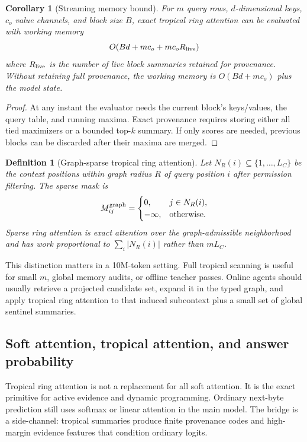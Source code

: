 \documentclass[11pt]{article}
\newtheorem{corollary}[theorem]{Corollary}
\newtheorem{definition}[theorem]{Definition}
\numberwithin{equation}{section}
\begin{document}
\begin{corollary}[Streaming memory bound]
For $m$ query rows, $d$-dimensional keys, $c_o$ value channels, and block size $B$, exact tropical ring attention can be evaluated with working memory
\begin{equation}
O(Bd+mc_o+m c_o R_{\rm live})
\end{equation}
where $R_{\rm live}$ is the number of live block summaries retained for provenance. Without retaining full provenance, the working memory is $O(Bd+mc_o)$ plus the model state.
\end{corollary}
\begin{proof}
At any instant the evaluator needs the current block's keys/values, the query table, and running maxima. Exact provenance requires storing either all tied maximizers or a bounded top-$k$ summary. If only scores are needed, previous blocks can be discarded after their maxima are merged.
\end{proof}

\begin{definition}[Graph-sparse tropical ring attention]
Let $N_R(i)\subseteq \{1,\ldots,L_C\}$ be the context positions within graph radius $R$ of query position $i$ after permission filtering. The sparse mask is
\begin{equation}
M_{ij}^{\rm graph}=\begin{cases}0,&j\in N_R(i),\\ -\infty,&\text{otherwise.}\end{cases}
\end{equation}
Sparse ring attention is exact attention over the graph-admissible neighborhood and has work proportional to $\sum_i |N_R(i)|$ rather than $mL_C$.
\end{definition}

This distinction matters in a 10M-token setting. Full tropical scanning is useful for small $m$, global memory audits, or offline teacher passes. Online agents should usually retrieve a projected candidate set, expand it in the typed graph, and apply tropical ring attention to that induced subcontext plus a small set of global sentinel summaries.

\subsection{Soft attention, tropical attention, and answer probability}
Tropical ring attention is not a replacement for all soft attention. It is the exact primitive for active evidence and dynamic programming. Ordinary next-byte prediction still uses softmax or linear attention in the main model. The bridge is a side-channel: tropical summaries produce finite provenance codes and high-margin evidence features that condition ordinary logits.
\end{document}
